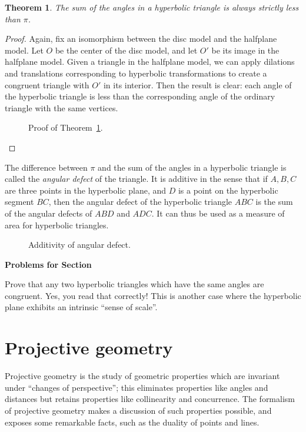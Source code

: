 \documentclass[12pt]{book}
\newcounter{exc}
\numberwithin{exc}{section}
\numberwithin{figure}{section}
\newenvironment{exer}{\vspace{0.1in}
\noindent \textbf{Problems for Section~\thesection} \vspace{0.1in}
\begin{list}{\arabic{exc}.}{\usecounter{exc}}}{\end{list}}
\newtheorem{theorem}{Theorem}[section]
\numberwithin{equation}{theorem}
\begin{document}
\begin{theorem} \label{thm:angular defect}
The sum of the angles in a hyperbolic triangle is always strictly
less than $\pi$.
\end{theorem}
\begin{proof}
Again, fix an isomorphism between the disc model and the halfplane model.
Let $O$ be the center of the disc model, and let $O'$ be its image in
the halfplane model.
Given a triangle in the halfplane model, we can apply dilations and 
translations corresponding to hyperbolic transformations to create a
congruent triangle with $O'$ in its interior.
Then the result is clear: each angle of the hyperbolic triangle is
less than the corresponding angle of the ordinary triangle with the
same vertices.
\begin{figure}[ht]
\caption{Proof of Theorem~\ref{thm:angular defect}.}
\end{figure}
\end{proof}
The difference between $\pi$ and the sum of the angles in a hyperbolic
triangle is called the \emph{angular defect} 
of the triangle. It is additive in the sense that if
$A,B,C$ are three points in the hyperbolic plane, and $D$ is a point
on the hyperbolic segment $BC$, then the angular defect of the hyperbolic
triangle $ABC$ is the sum of the angular defects of $ABD$ and $ADC$.
It can thus be used as a measure of area for hyperbolic triangles.
\begin{figure}[ht]
\caption{Additivity of angular defect.}
\end{figure}

\begin{exer}
\item
Prove that 
any two hyperbolic triangles which have the same angles
are congruent. Yes, you read that correctly!
This is another case where the hyperbolic plane exhibits
an intrinsic ``sense of scale''.
\end{exer}

\chapter{Projective geometry}
\label{chap:projective}

Projective geometry is the study of geometric properties which are invariant
under ``changes of perspective''; this eliminates properties like angles
and distances but retains properties like collinearity and concurrence.
The formalism of projective geometry makes a discussion 
of such properties possible, and exposes some remarkable facts, such 
as the duality of points and lines.
\end{document}
